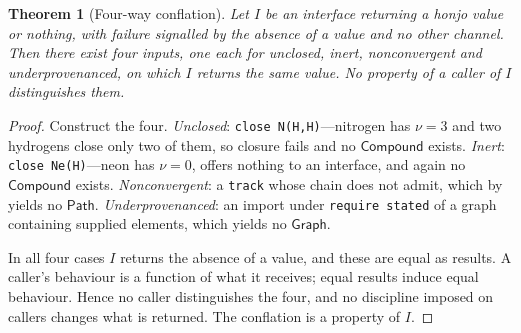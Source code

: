 \documentclass[11pt,twocolumn,a4paper]{article}
\theoremstyle{thmstyle}
\newtheorem{theorem}{Theorem}[section]
\theoremstyle{definition}
\theoremstyle{remark}
\newcommand{\hj}[1]{\texttt{#1}}
\begin{document}
\begin{theorem}[Four-way conflation]
\label{thm:conflation}
Let $I$ be an interface returning a honjo value or nothing, with failure
signalled by the absence of a value and no other channel. Then there
exist four inputs, one each for \textsf{unclosed}, \textsf{inert},
\textsf{nonconvergent} and \textsf{underprovenanced}, on which $I$
returns the same value. No property of a caller of $I$ distinguishes
them.
\end{theorem}

\begin{proof}
Construct the four. \emph{Unclosed}: \hj{close N(H,H)}---nitrogen has
$\nu=3$ and two hydrogens close only two of them, so closure fails and no
$\mathsf{Compound}$ exists. \emph{Inert}: \hj{close Ne(H)}---neon has
$\nu=0$, offers nothing to an interface, and again no $\mathsf{Compound}$
exists. \emph{Nonconvergent}: a \hj{track} whose chain does not admit,
which by  yields no $\mathsf{Path}$.
\emph{Underprovenanced}: an import under \hj{require stated} of a graph
containing supplied elements, which yields no $\mathsf{Graph}$.

In all four cases $I$ returns the absence of a value, and these are equal
as results. A caller's behaviour is a function of what it receives; equal
results induce equal behaviour. Hence no caller distinguishes the four,
and no discipline imposed on callers changes what is returned. The
conflation is a property of $I$.
\end{proof}
\end{document}
